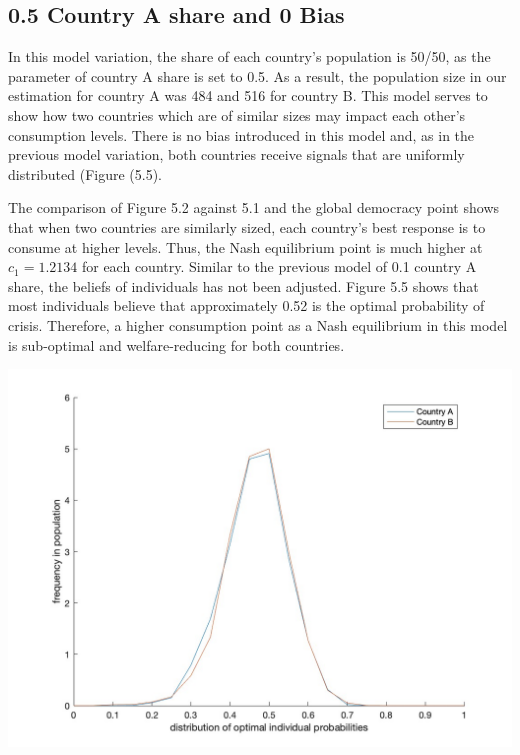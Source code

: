 \documentclass[11pt,preprint, authoryear]{elsarticle}
\let\origfigure\figure
\let\endorigfigure\endfigure
\renewenvironment{figure}[1][2] {
    \expandafter\origfigure\expandafter[H]
} {
    \endorigfigure
}
\numberwithin{equation}{section}
\numberwithin{figure}{section}
\numberwithin{table}{section}
\begin{document}
\hypertarget{country-a-share-and-0-bias}{%
\subsection*{0.5 Country A share and 0
Bias}\label{country-a-share-and-0-bias}}

In this model variation, the share of each country's population is
50/50, as the parameter of country A share is set to 0.5. As a result,
the population size in our estimation for country A was 484 and 516 for
country B. This model serves to show how two countries which are of
similar sizes may impact each other's consumption levels. There is no
bias introduced in this model and, as in the previous model variation,
both countries receive signals that are uniformly distributed (Figure
(5.5).

The comparison of Figure 5.2 against 5.1 and the global democracy point
shows that when two countries are similarly sized, each country's best
response is to consume at higher levels. Thus, the Nash equilibrium
point is much higher at \(c_1=1.2134\) for each country. Similar to the
previous model of 0.1 country A share, the beliefs of individuals has
not been adjusted. Figure 5.5 shows that most individuals believe that
approximately 0.52 is the optimal probability of crisis. Therefore, a
higher consumption point as a Nash equilibrium in this model is
sub-optimal and welfare-reducing for both countries.

\begin{figure}[H]

{\centering \includegraphics[width=0.8\linewidth]{images/Fig4_0.5Size0Bias} 

}

\caption{50/50 country split model: Kernel density function of the distribution of the optimal probabilty of crisis and frequency thereof across individuals in country A and country B}\label{fig:unnamed-chunk-6}
\end{figure}
\end{document}
